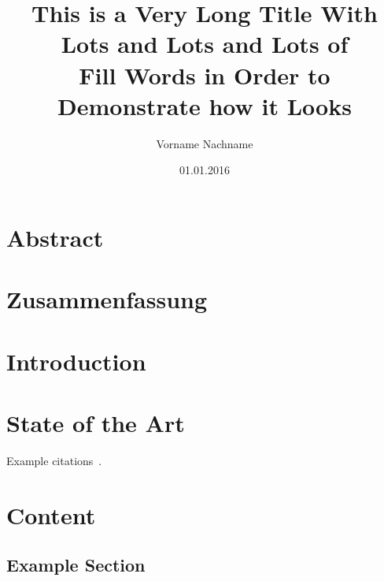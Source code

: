 \documentclass[%
]{tumDiss}
\title{%
  This is a Very Long Title With Lots and Lots and Lots of\\
  Fill Words in Order to Demonstrate how it Looks\\
}
\author{Vorname Nachname}
\date{01.01.2016}
\begin{document}
\frontmatter
\maketitle



\chapter{Abstract}

\lipsum[1-4]



\chapter{Zusammenfassung}

\lipsum[1-4]



\tableofcontents
\listoffigures
\listoftables
\printglossary[type=\acronymtype, nonumberlist]



\mainmatter
\chapter{Introduction}
\label{chap:introduction}

\lipsum[1-4]



\chapter{State of the Art}
\label{chap:sota}

Example citations~\cite{barham2003xen, LIS}.



\chapter{Content}
\label{chap:content}

\lipsum[1]

\section{Example Section}
\end{document}
